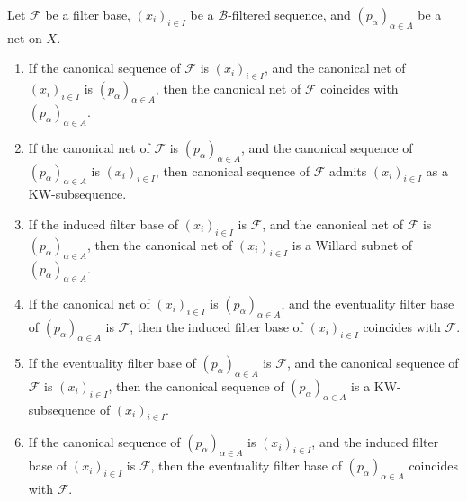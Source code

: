 \documentclass{treatise}
\begin{document}
\begin{proposition}
Let $\mathcal{F}$ be a filter base, $(x_i)_{i \in I}$ be a $\mathcal{B}$-filtered sequence, and $(p_\alpha)_{\alpha \in A}$ be a net on $X$.
\begin{enumerate}
    \item If the canonical sequence of $\mathcal{F}$ is $(x_i)_{i \in I}$, and the canonical net of $(x_i)_{i \in I}$ is $(p_\alpha)_{\alpha \in A}$, then the canonical net of $\mathcal{F}$ coincides with $(p_\alpha)_{\alpha \in A}$.
    \item If the canonical net of $\mathcal{F}$ is $(p_\alpha)_{\alpha \in A}$, and the canonical sequence of $(p_\alpha)_{\alpha \in A}$ is $(x_i)_{i \in I}$, then canonical sequence of $\mathcal{F}$ admits $(x_i)_{i \in I}$ as a KW-subsequence.
    \item If the induced filter base of $(x_i)_{i \in I}$ is $\mathcal{F}$, and the canonical net of $\mathcal{F}$ is $(p_\alpha)_{\alpha \in A}$, then the canonical net of $(x_i)_{i \in I}$ is a Willard subnet of $(p_\alpha)_{\alpha \in A}$.
    \item If the canonical net of $(x_i)_{i \in I}$ is $(p_\alpha)_{\alpha \in A}$, and the eventuality filter base of $(p_\alpha)_{\alpha \in A}$ is $\mathcal{F}$, then the induced filter base of $(x_i)_{i \in I}$ coincides with $\mathcal{F}$.
    \item If the eventuality filter base of $(p_\alpha)_{\alpha \in A}$ is $\mathcal{F}$, and the canonical sequence of $\mathcal{F}$ is $(x_i)_{i \in I}$, then the canonical sequence of $(p_\alpha)_{\alpha \in A}$ is a KW-subsequence of $(x_i)_{i \in I}$.
    \item If the canonical sequence of $(p_\alpha)_{\alpha \in A}$ is $(x_i)_{i \in I}$, and the induced filter base of $(x_i)_{i \in I}$ is $\mathcal{F}$, then the eventuality filter base of $(p_\alpha)_{\alpha \in A}$ coincides with $\mathcal{F}$.
\end{enumerate}
\end{proposition}
\end{document}
